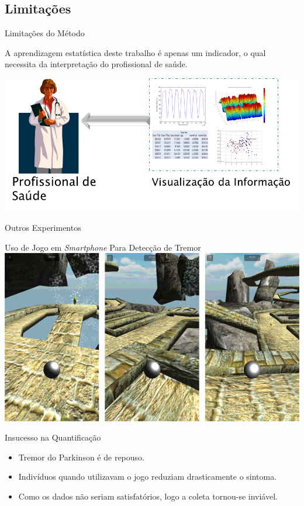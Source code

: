 \documentclass{beamer}
\begin{document}
\subsection{Limitações}
\begin{frame}{Limitações do Método}
	\begin{block}{}
	A aprendizagem estatística deste trabalho é apenas um indicador, o qual necessita da interpretação do profissional de saúde.
	\end{block}
  \begin{block}{}
      \center \includegraphics[height=2 in]{img/visualizacaomedico.png}
  \end{block}
\end{frame}

\begin{frame}{Outros Experimentos}
	\begin{block}{Uso de Jogo em \textit{Smartphone} Para Detecção de Tremor}
	\center \includegraphics[height=1 in]{img/pinball_world.png}
	\end{block}
	\begin{block}{Insucesso na Quantificação}
			\begin{itemize}[<+->]
			\item Tremor do Parkinson é de repouso.
			\item Indivíduos quando utilizavam o jogo reduziam drasticamente o sintoma.
			\item Como os dados não seriam satisfatórios, logo a coleta tornou-se inviável.
		\end{itemize}
	\end{block}
\end{frame}
\end{document}
